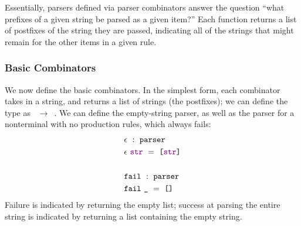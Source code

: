       Essentially, parsers defined via parser combinators answer the question ``what prefixes of a given string be parsed as a given item?''  Each function returns a list of postfixes of the string they are passed, indicating all of the strings that might remain for the other items in a given rule.  
      
    \subsubsection{Basic Combinators}
      We now define the basic combinators.  In the simplest form, each combinator takes in a string, and returns a list of strings (the postfixes); we can define the type  as ~$\to$~.  We can define the empty-string parser, as well as the parser for a nonterminal with no production rules, which always fails:
\begin{align*}
&\epsilon~:~\texttt{parser}\\
&\epsilon~\textcolor{violet}{\texttt{str}}~=~\texttt{[}\textcolor{violet}{\texttt{str}}\texttt{]} \\ \\
&\texttt{fail}~:~\texttt{parser}\\
&\texttt{fail}~\texttt{\_}~=~\texttt{[]}
\end{align*}
      Failure is indicated by returning the empty list; success at parsing the entire string is indicated by returning a list containing the empty string.
      

